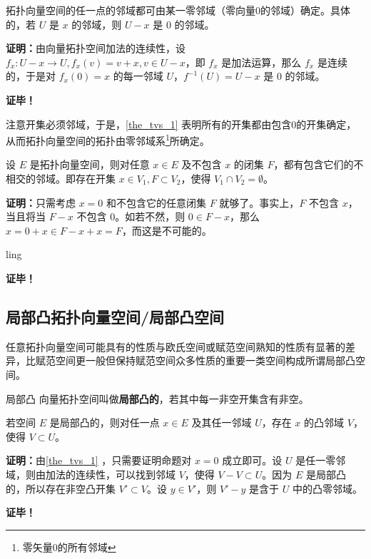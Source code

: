 \begin{theorem}{}\label{the_tvs_1}
拓扑向量空间的任一点的邻域都可由某一零邻域（零向量0的邻域）确定。具体的，若 $U$ 是 $x$ 的邻域，则 $U-x$ 是 $0$ 的邻域。
\end{theorem}

\textbf{证明：}由向量拓扑空间加法的连续性，设 $f_x:U-x\rightarrow U,f_x(v)=v+x,v\in U-x$，即 $f_x$ 是加法运算，那么 $f_x$ 是连续的，于是对 $f_x(0)=x$ 的每一邻域 $U$，$f^{-1}(U)=U-x$ 是 $0$ 的邻域。

\textbf{证毕！}

注意开集必须邻域，于是，\autoref{the_tvs_1} 表明所有的开集都由包含0的开集确定，从而拓扑向量空间的拓扑由零邻域系\footnote{零矢量0的所有邻域}所确定。

\begin{theorem}{}
设 $E$ 是拓扑向量空间，则对任意 $x\in E$ 及不包含 $x$ 的闭集 $F$，都有包含它们的不相交的邻域。即存在开集 $x\in V_1,F\subset V_2$，使得 $V_1\cap V_2=\emptyset$。
\end{theorem}

\textbf{证明：}只需考虑 $x=0$ 和不包含它的任意闭集 $F$ 就够了。事实上，$F$ 不包含 $x$，当且将当 $F-x$ 不包含 0。如若不然，则 $0\in F-x$，那么 $x=0+x\in F-x+x=F$，而这是不可能的。

ling

\textbf{证毕！}





\subsection{局部凸拓扑向量空间/局部凸空间}
任意拓扑向量空间可能具有的性质与欧氏空间或赋范空间熟知的性质有显著的差异，比赋范空间更一般但保持赋范空间众多性质的重要一类空间构成所谓局部凸空间。


\begin{definition}{局部凸}
向量拓扑空间叫做\textbf{局部凸的}，若其中每一非空开集含有非空。
\end{definition}

\begin{theorem}{}
若空间 $E$ 是局部凸的，则对任一点 $x\in E$ 及其任一邻域 $U$，存在 $x$ 的凸邻域 $V$，使得 $V\subset U$。
\end{theorem}

\textbf{证明：}由\autoref{the_tvs_1} ，只需要证明命题对 $x=0$ 成立即可。设 $U$ 是任一零邻域，则由加法的连续性，可以找到邻域 $V$，使得 $V-V\subset U$。因为 $E$ 是局部凸的，所以存在非空凸开集 $V'\subset V$。设 $y\in V'$，则 $V'-y$ 是含于 $U$ 中的凸零邻域。


\textbf{证毕！}









